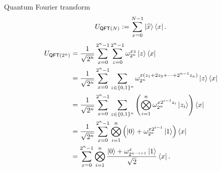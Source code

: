 \documentclass{beamer}
\begin{document}
\begin{frame}{Quantum Fourier transform}
\small
\vspace{-1em}
\begin{align*}
U_{\mathsf{QFT}(N)} := \sum_{x=0}^{N-1}\ket{\widehat{x}}\bra{x}.
\end{align*}
\begin{align*}
U_{\mathsf{QFT}(2^n)} &= \frac1{\sqrt{2^{n}}}\sum_{x=0}^{2^n-1}\sum_{z=0}^{2^n-1}\omega_{2^n}^{xz}\ket{z}\bra{x}\\
&= \frac1{\sqrt{2^{n}}}\sum_{x=0}^{2^n-1}\sum_{z\in\{0,1\}^n}\omega_{2^n}^{x(z_1+2z_2+\dotsb +2^{n-1}z_n)}\ket{z}\bra{x}\\
&= \frac1{\sqrt{2^{n}}}\sum_{x=0}^{2^n-1}\sum_{z\in\{0,1\}^n}\left(\bigotimes_{i=1}^n\omega_{2^n}^{x2^{i-1}z_i}\ket{z_i}\right)\bra{x}\\
&= \frac1{\sqrt{2^{n}}}\sum_{x=0}^{2^n-1}\bigotimes_{i=1}^n \left(\ket{0} + \omega_{2^n}^{x2^{i-1}}\ket{1}\right)\bra{x}\\
&= \sum_{x=0}^{2^n-1}\bigotimes_{i=1}^n \frac{\ket{0} + \omega_{2^{n-i+1}}^{x}\ket{1}}{\sqrt{2}}\bra{x}.
\end{align*}
\end{frame}
\fi
\end{document}
